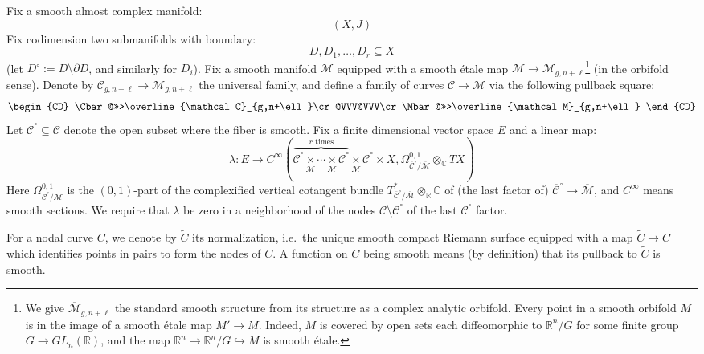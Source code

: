 \documentclass[12pt]{article}
\theoremstyle{definition}
\theoremstyle{remark}
\numberwithin{equation}{subsection}
\newcommand{\CC}{\mathbb C}
\newcommand{\RR}{\mathbb R}
\newcommand{\Mbar}{\overline{\mathcal M}}
\newcommand{\Cbar}{\overline{\mathcal C}}
\begin{document}
Fix a smooth almost complex manifold:
\begin{equation}
(X,J)
\end{equation}
Fix codimension two submanifolds with boundary:
\begin{equation}
D,D_1,\ldots,D_r\subseteq X
\end{equation}
(let $D^\circ:=D\setminus\partial D$, and similarly for $D_i$).  Fix a smooth manifold $\Mbar$ equipped with a smooth \'etale map $\Mbar\to\Mbar_{g,n+\ell}$\footnote{We give $\Mbar_{g,n+\ell}$ the standard smooth structure from its structure as a complex analytic orbifold.  Every point in a smooth orbifold $M$ is in the image of a smooth \'etale map $M'\to M$.  Indeed, $M$ is covered by open sets each diffeomorphic to $\RR^n/G$ for some finite group $G\to GL_n(\RR)$, and the map $\RR^n\to\RR^n/G\hookrightarrow M$ is smooth \'etale.} (in the orbifold sense).  Denote by $\Cbar_{g,n+\ell}\to\Mbar_{g,n+\ell}$ the universal family, and define a family of curves $\Cbar\to\Mbar$ via the following pullback square:
\begin{equation}
\begin{CD}
\Cbar@>>>\Cbar_{g,n+\ell}\cr
@VVV@VVV\cr
\Mbar@>>>\Mbar_{g,n+\ell}
\end{CD}
\end{equation}
Let $\Cbar^\circ\subseteq\Cbar$ denote the open subset where the fiber is smooth.  Fix a finite dimensional vector space $E$ and a linear map:
\begin{equation}\label{lambdafix}
\lambda:E\to C^\infty(\overbrace{\Cbar^\circ\underset\Mbar\times\cdots\underset\Mbar\times\Cbar^\circ}^{r\text{ times}}{}\underset\Mbar\times\Cbar^\circ\times X,\Omega^{0,1}_{\Cbar^\circ/\Mbar}\otimes_\CC TX)
\end{equation}
Here $\Omega^{0,1}_{\Cbar^\circ/\Mbar}$ is the $(0,1)$-part of the complexified vertical cotangent bundle $T^\ast_{\Cbar^\circ/\Mbar}\otimes_\RR\CC$ of (the last factor of) $\Cbar^\circ\to\Mbar$, and $C^\infty$ means smooth sections.  We require that $\lambda$ be zero in a neighborhood of the nodes $\Cbar\setminus\Cbar^\circ$ of the last $\Cbar^\circ$ factor.

For a nodal curve $C$, we denote by $\tilde C$ its normalization, i.e.\ the unique smooth compact Riemann surface equipped with a map $\tilde C\to C$ which identifies points in pairs to form the nodes of $C$.  A function on $C$ being smooth means (by definition) that its pullback to $\tilde C$ is smooth.
\end{document}
